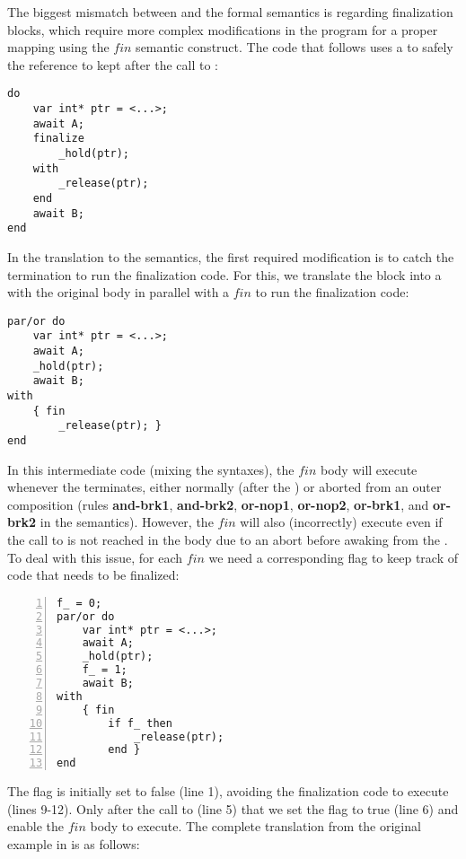 The biggest mismatch between \CEU and the formal semantics is regarding 
finalization blocks, which require more complex modifications in the program
for a proper mapping using the $fin$ semantic construct.
The code that follows uses a  to safely  the 
reference to  kept after the call to :

\begin{lstlisting}
do
    var int* ptr = <...>;
    await A;
    finalize
        _hold(ptr);
    with
        _release(ptr);
    end
    await B;
end
\end{lstlisting}

In the translation to the semantics, the first required modification is to 
catch the  termination to run the finalization code.
For this, we translate the block into a  with the original body in 
parallel with a $fin$ to run the finalization code:

\begin{lstlisting}
par/or do
    var int* ptr = <...>;
    await A;
    _hold(ptr);
    await B;
with
    { fin
        _release(ptr); }
end
\end{lstlisting}

In this intermediate code (mixing the syntaxes), the $fin$ body will execute
whenever the  terminates, either normally (after the ) or aborted from an outer composition (rules \textbf{and-brk1}, 
\textbf{and-brk2}, \textbf{or-nop1}, \textbf{or-nop2}, \textbf{or-brk1}, and 
\textbf{or-brk2} in the semantics).
%
%
However, the $fin$ will also (incorrectly) execute even if the call to 
 is not reached in the body due to an abort before awaking from 
the .
%
To deal with this issue, for each $fin$ we need a corresponding flag to keep 
track of code that needs to be finalized:

\begin{lstlisting}[numbers=left,xleftmargin=2em]
f_ = 0;
par/or do
    var int* ptr = <...>;
    await A;
    _hold(ptr);
    f_ = 1;
    await B;
with
    { fin
        if f_ then
            _release(ptr);
        end }
end
\end{lstlisting}

The flag is initially set to false (line 1), avoiding the finalization code to 
execute (lines 9-12).
Only after the call to  (line 5) that we set the flag to true 
(line 6) and enable the $fin$ body to execute.
%
The complete translation from the original example in \CEU is as follows:

